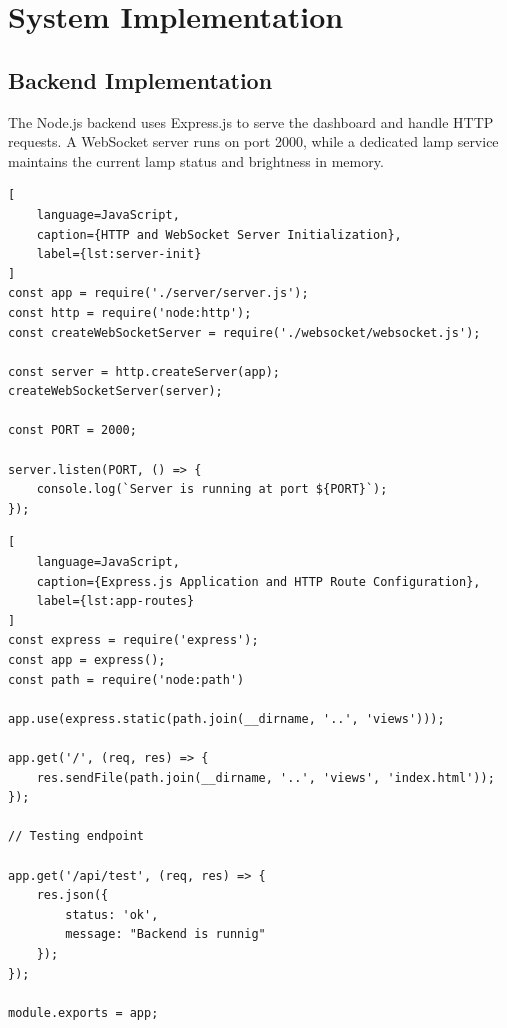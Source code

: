 \documentclass[12pt,a4paper]{article}
\begin{document}


\newpage
\section*{System Implementation}

\vspace{0.2cm}

\subsection*{Backend Implementation}

The Node.js backend uses Express.js to serve the dashboard
and handle HTTP requests. A WebSocket server runs on port
2000, while a dedicated lamp service maintains the current
lamp status and brightness in memory.

\vspace{1cm}

\begin{lstlisting}[
    language=JavaScript,
    caption={HTTP and WebSocket Server Initialization},
    label={lst:server-init}
]
const app = require('./server/server.js');
const http = require('node:http');
const createWebSocketServer = require('./websocket/websocket.js');

const server = http.createServer(app);
createWebSocketServer(server);

const PORT = 2000;

server.listen(PORT, () => {
    console.log(`Server is running at port ${PORT}`);
});
\end{lstlisting}

\vspace{1cm}

\begin{lstlisting}[
    language=JavaScript,
    caption={Express.js Application and HTTP Route Configuration},
    label={lst:app-routes}
]
const express = require('express');
const app = express();
const path = require('node:path')

app.use(express.static(path.join(__dirname, '..', 'views')));

app.get('/', (req, res) => {
    res.sendFile(path.join(__dirname, '..', 'views', 'index.html'));
});

// Testing endpoint

app.get('/api/test', (req, res) => {
    res.json({
        status: 'ok',
        message: "Backend is runnig"
    });
});

module.exports = app;
\end{lstlisting}
\end{document}
